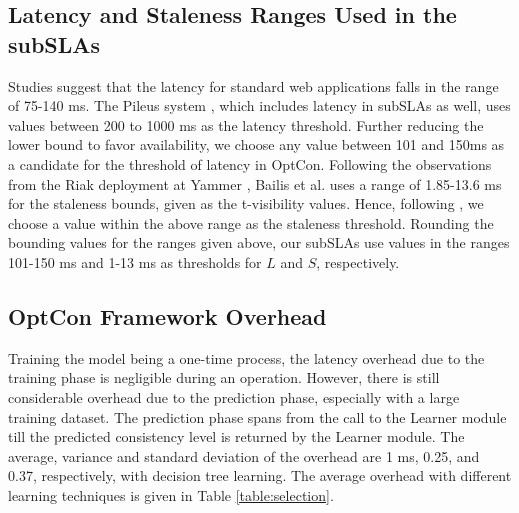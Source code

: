 \documentclass[conference]{IEEEtran}
\begin{document}
\subsection{Latency and Staleness Ranges Used in the subSLAs}\label{sec:experimental}
 Studies \cite{Everts:2012:Online}
         suggest that
 the latency for standard web applications falls in the range of 75-140 ms. The Pileus system
\cite{Terry:2013:CSL:2517349.2522731}, which includes latency in subSLAs as well, uses values between  200 to 1000 ms as the latency
threshold. Further reducing the lower bound to favor availability, we choose any value between 101 and 150ms as a candidate for the threshold of latency in OptCon. Following the observations from the Riak deployment at Yammer \cite{YMMRRiak}, Bailis et al. \cite{Bailis:2012:PBS:2212351.2212359} uses a range of 1.85-13.6 ms for the staleness bounds, given as the
        t-visibility values. Hence, following \cite{Bailis:2012:PBS:2212351.2212359}, we choose a value within the above range as the staleness threshold. Rounding the bounding values for the ranges given above, our subSLAs use values in the ranges  101-150 ms and 1-13 ms as thresholds for $L$ and $S$, respectively.

\subsection{OptCon Framework Overhead}\label{sec:over}
Training the model being a one-time process, the latency overhead due to the training phase is negligible during an operation. However, there is still considerable overhead due to the prediction phase, especially with a large training dataset. The  prediction phase spans from the call to the Learner module till the predicted consistency level is returned by the Learner module. The average, variance and standard deviation of the overhead are 1 ms, 0.25, and 0.37, respectively, with decision tree learning. The average overhead with
         different learning techniques is given in Table \ref{table:selection}.
\end{document}
